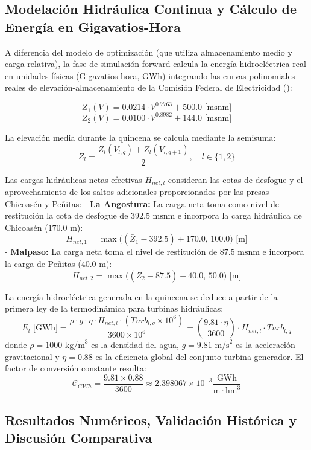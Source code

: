 \documentclass[
  spanish,
  letterpaper,
]{scrreprt}
\theoremstyle{definition}
\theoremstyle{remark}
\begin{document}
\subsection{Modelación Hidráulica Continua y Cálculo de Energía en
Gigavatios-Hora}\label{modelaciuxf3n-hidruxe1ulica-continua-y-cuxe1lculo-de-energuxeda-en-gigavatios-hora}

A diferencia del modelo de optimización (que utiliza almacenamiento
medio y carga relativa), la fase de simulación forward calcula la
energía hidroeléctrica real en unidades físicas (Gigavatios-hora, GWh)
integrando las curvas polinomiales reales de elevación-almacenamiento de
la Comisión Federal de Electricidad
():

\[Z_1(V) = 0.0214 \cdot V^{0.7763} + 500.0\text{ [msnm]}\]
\[Z_2(V) = 0.0100 \cdot V^{0.8982} + 144.0\text{ [msnm]}\]

La elevación media durante la quincena se calcula mediante la semisuma:
\[\bar{Z}_l = \frac{Z_l(V_{l,q}) + Z_l(V_{l,q+1})}{2}, \quad l \in \{1, 2\}\]

Las cargas hidráulicas netas efectivas \(H_{net,l}\) consideran las
cotas de desfogue y el aprovechamiento de los saltos adicionales
proporcionados por las presas Chicoasén y Peñitas: - \textbf{La
Angostura:} La carga neta toma como nivel de restitución la cota de
desfogue de \(392.5\text{ msnm}\) e incorpora la carga hidráulica de
Chicoasén (\(170.0\text{ m}\)):
\[H_{net,1} = \max\Big( (\bar{Z}_1 - 392.5) + 170.0, \, 100.0 \Big)\text{ [m]}\]
- \textbf{Malpaso:} La carga neta toma el nivel de restitución de
\(87.5\text{ msnm}\) e incorpora la carga de Peñitas
(\(40.0\text{ m}\)):
\[H_{net,2} = \max\Big( (\bar{Z}_2 - 87.5) + 40.0, \, 50.0 \Big)\text{ [m]}\]

La energía hidroeléctrica generada en la quincena se deduce a partir de
la primera ley de la termodinámica para turbinas hidráulicas:
\[E_l\text{ [GWh]} = \frac{\rho \cdot g \cdot \eta \cdot H_{net,l} \cdot (Turb_{l,q} \times 10^6)}{3600 \times 10^6} = \left( \frac{9.81 \cdot \eta}{3600} \right) \cdot H_{net,l} \cdot Turb_{l,q}\]
donde \(\rho = 1000\text{ kg/m}^3\) es la densidad del agua,
\(g = 9.81\text{ m/s}^2\) es la aceleración gravitacional y
\(\eta = 0.88\) es la eficiencia global del conjunto turbina-generador.
El factor de conversión constante resulta:
\[\mathcal{C}_{GWh} = \frac{9.81 \times 0.88}{3600} \approx 2.398067 \times 10^{-3} \frac{\text{GWh}}{\text{m} \cdot \text{hm}^3}\]

\subsection{Resultados Numéricos, Validación Histórica y Discusión
Comparativa}\label{resultados-numuxe9ricos-validaciuxf3n-histuxf3rica-y-discusiuxf3n-comparativa}
\end{document}
